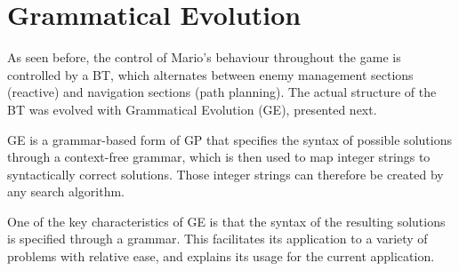 \documentclass[conference]{IEEEtran}
\begin{document}
\begin{itemize}



\end{itemize}

\section{Grammatical Evolution}\label{GE}

As seen before, the control of Mario's behaviour throughout the game is
controlled by a BT, which alternates between enemy management sections
(reactive) and navigation sections (path planning). The actual structure of the
BT was evolved with Grammatical Evolution \cite{OR03} (GE), presented next.

GE is a grammar-based form of GP \cite{MNW10} that specifies the syntax of
possible solutions through a context-free grammar, which is then used to map
integer strings to syntactically correct solutions. Those integer strings can
therefore be created by any search algorithm.

One of the key characteristics of GE is that the syntax of the resulting
solutions is specified through a grammar. This facilitates its application to a
variety of problems with relative ease, and explains its usage for the current
application.
\end{document}
